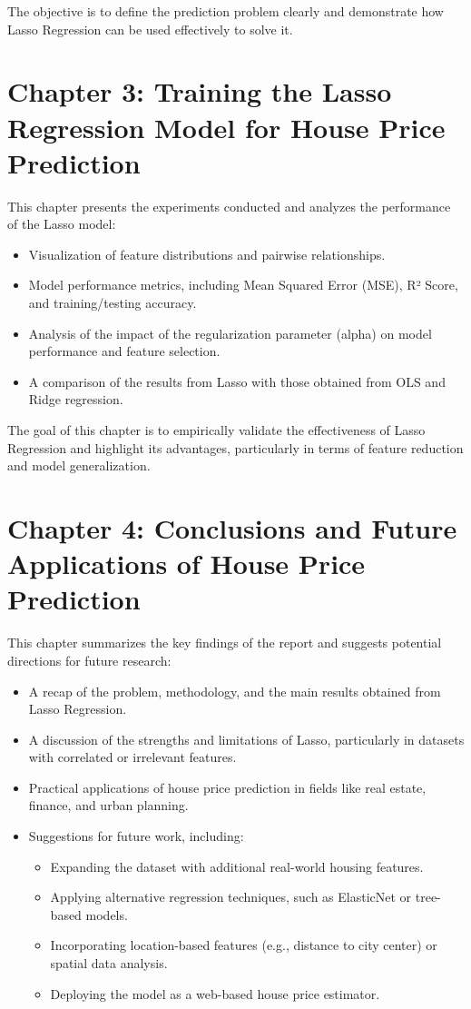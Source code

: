 \documentclass[12pt, a4paper]{report}
\begin{document}
The objective is to define the prediction problem clearly and demonstrate how Lasso Regression can be used effectively to solve it.

\section*{Chapter 3: Training the Lasso Regression Model for House Price Prediction}

This chapter presents the experiments conducted and analyzes the performance of the Lasso model:

\begin{itemize}
    \item Visualization of feature distributions and pairwise relationships.
    \item Model performance metrics, including Mean Squared Error (MSE), R² Score, and training/testing accuracy.
    \item Analysis of the impact of the regularization parameter (alpha) on model performance and feature selection.
    \item A comparison of the results from Lasso with those obtained from OLS and Ridge regression.
\end{itemize}

The goal of this chapter is to empirically validate the effectiveness of Lasso Regression and highlight its advantages, particularly in terms of feature reduction and model generalization.

\section*{Chapter 4: Conclusions and Future Applications of House Price Prediction}

This chapter summarizes the key findings of the report and suggests potential directions for future research:

\begin{itemize}
    \item A recap of the problem, methodology, and the main results obtained from Lasso Regression.
    \item A discussion of the strengths and limitations of Lasso, particularly in datasets with correlated or irrelevant features.
    \item Practical applications of house price prediction in fields like real estate, finance, and urban planning.
    \item Suggestions for future work, including:
    \begin{itemize}
        \item Expanding the dataset with additional real-world housing features.
        \item Applying alternative regression techniques, such as ElasticNet or tree-based models.
        \item Incorporating location-based features (e.g., distance to city center) or spatial data analysis.
        \item Deploying the model as a web-based house price estimator.
    \end{itemize}
\end{itemize}
\end{document}
